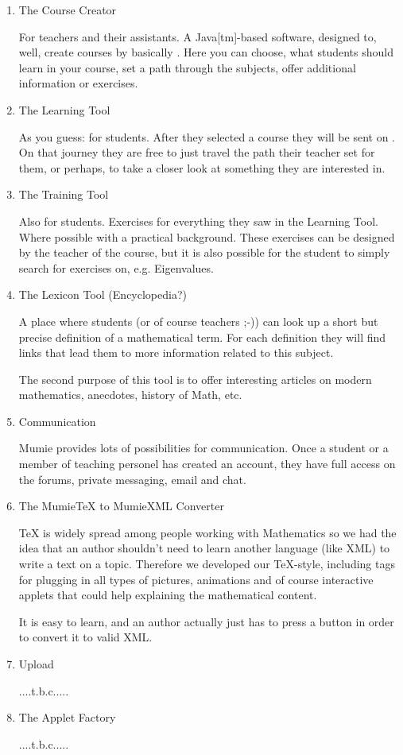 \documentclass{webpage}
\begin{document}
\begin{enumerate}
\item The Course Creator

For teachers and their assistants. A Java[tm]-based software, designed to, well, create courses by 
basically . Here you can choose, what students should learn in your course, 
set a path through the subjects, offer additional information or exercises.
\item The Learning Tool

As you guess: for students. After they selected a course they will be sent on .
On that journey they are free to just travel the path their teacher set for them, or perhaps, 
 to take a closer look at something they are interested in.

\item The Training Tool

Also for students. Exercises for everything they saw in the Learning Tool. Where possible with
a practical background. These exercises can be designed by the teacher of the course, but it is
also possible for the student to simply search for exercises on, e.g. Eigenvalues.
\item The Lexicon Tool (Encyclopedia?)

A place where students (or of course teachers ;-)) can look up a short but 
precise definition of a mathematical term.
For each definition they will find links that lead them
to more information related to this subject.

The second purpose of this tool is to offer interesting articles on modern mathematics, anecdotes,
history of Math, etc.
\item Communication

Mumie provides lots of possibilities for communication. Once a student or a member of teaching 
personel has created an account, they have full access on the forums, private messaging, email and
chat.

\item The MumieTeX to MumieXML Converter

TeX is widely spread among people working with Mathematics so we had the idea that an author 
shouldn't need to learn another language (like XML) to write a text on a topic. Therefore we developed 
our  TeX-style, including tags for plugging in all types of pictures, animations and of 
course interactive applets that could help explaining the mathematical content.

It is easy to learn, and an author actually just has to press a button in order to convert it to 
valid XML. %
\item Upload

....t.b.c.....

\item The Applet Factory

....t.b.c.....
\end{enumerate}
\end{document}
